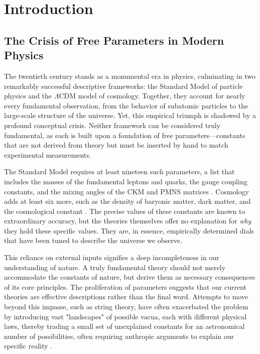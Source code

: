 \section{Introduction}

\subsection{The Crisis of Free Parameters in Modern Physics}
The twentieth century stands as a monumental era in physics, culminating in two remarkably successful descriptive frameworks: the Standard Model of particle physics and the \(\Lambda\)CDM model of cosmology. Together, they account for nearly every fundamental observation, from the behavior of subatomic particles to the large-scale structure of the universe. Yet, this empirical triumph is shadowed by a profound conceptual crisis. Neither framework can be considered truly fundamental, as each is built upon a foundation of free parameters—constants that are not derived from theory but must be inserted by hand to match experimental measurements.

The Standard Model requires at least nineteen such parameters, a list that includes the masses of the fundamental leptons and quarks, the gauge coupling constants, and the mixing angles of the CKM and PMNS matrices \parencite{PDG2024, Zyla2022}. Cosmology adds at least six more, such as the density of baryonic matter, dark matter, and the cosmological constant \parencite{Planck2018}. The precise values of these constants are known to extraordinary accuracy, but the theories themselves offer no explanation for \textit{why} they hold these specific values. They are, in essence, empirically determined dials that have been tuned to describe the universe we observe.

This reliance on external inputs signifies a deep incompleteness in our understanding of nature. A truly fundamental theory should not merely accommodate the constants of nature, but derive them as necessary consequences of its core principles. The proliferation of parameters suggests that our current theories are effective descriptions rather than the final word. Attempts to move beyond this impasse, such as string theory, have often exacerbated the problem by introducing vast "landscapes" of possible vacua, each with different physical laws, thereby trading a small set of unexplained constants for an astronomical number of possibilities, often requiring anthropic arguments to explain our specific reality \parencite{Susskind2003, Weinberg1987}.

